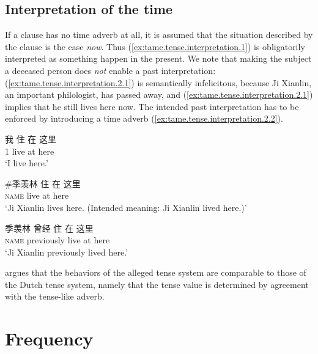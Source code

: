 \documentclass[UTF8, a4paper, oneside, scheme=plain, 12pt]{ctexrep}
\newcommand{\translate}[1]{`#1'}
\newcommand*{\category}[1]{\textsc{#1}}
\begin{document}
\subsection{Interpretation of the time}

If a clause has no time adverb at all,
it is assumed that the situation described by the clause 
is the case \emph{now}.
Thus (\ref{ex:tame.tense.interpretation.1}) is obligatorily interpreted as something happen in the present.
We note that making the subject a deceased person does \emph{not}
enable a past interpretation:
(\ref{ex:tame.tense.interpretation.2.1}) is semantically infelicitous,
because Ji Xianlin, an important philologist, has passed away,
and (\ref{ex:tame.tense.interpretation.2.1}) implies that he still lives here now.
The intended past interpretation has to be enforced by introducing a time adverb
(\ref{ex:tame.tense.interpretation.2.2}).

\begin{exe}
    \ex\label{ex:tame.tense.interpretation.1} 
    \gll 我 住 在 这里 \\
    1 live at here \\
    \glt\translate{I live here.}

    \ex\label{ex:tame.tense.interpretation.2} 
    \begin{xlist}
        \ex\label{ex:tame.tense.interpretation.2.1} 
        \gll \#季羡林 住 在 这里  \\
        \category{name} live at here \\
        \glt\translate{Ji Xianlin lives here. (Intended meaning: Ji Xianlin lived here.)}

        \ex\label{ex:tame.tense.interpretation.2.2} 
        \gll 季羡林 曾经 住 在 这里  \\
        \category{name} previously live at here \\
        \glt\translate{Ji Xianlin previously lived here.}
    \end{xlist}
\end{exe}

\citet{sybesma2007whether} argues that the behaviors of the alleged tense system
are comparable to those of the Dutch tense system,
namely that the tense value is determined by agreement with the tense-like adverb.

\section{Frequency}
\end{document}
